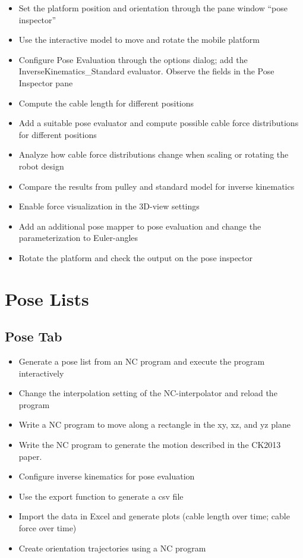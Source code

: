 \begin{itemize}
\item  {Set the platform position and orientation through the
  pane window ``pose inspector''}
\item
  {Use the interactive model to move and rotate the mobile
  platform}
\item  {Configure Pose Evaluation through the options dialog;
  add the InverseKinematics\_Standard evaluator. Observe the fields in
  the Pose Inspector
  pane}
\item  {Compute the cable length for different
  positions}
\item  {Add a suitable pose evaluator and compute possible
  cable force distributions for different
  positions}
\item  {Analyze how cable force distributions change when
  scaling or rotating the robot
  design}
\item  {Compare the results from pulley and standard model for
  inverse
  kinematics}
\end{itemize}

\begin{itemize}
\item  {Enable force visualization in the 3D-view
  settings}
\item  {Add an additional pose mapper to pose evaluation and
  change the parameterization to
  Euler-angles}
\item  {Rotate the platform and check the output on the pose
  inspector}
\end{itemize}

\section{Pose Lists}
\subsection{Pose Tab}

\begin{itemize}
\item  {Generate a pose list from an NC program and execute the
  program
  interactively}
\item  {Change the interpolation setting of the NC-interpolator
  and reload the
  program}
\item  {Write a NC program to move along a rectangle in the xy,
  xz, and yz
  plane}
\item  {Write the NC program to generate the motion described
  in the CK2013
  paper.}
\item  {Configure inverse kinematics for pose
  evaluation}
\item  {Use the export function to generate a csv
  file}
\item  {Import the data in Excel and generate plots (cable
  length over time; cable force over
  time)}
\item  {Create orientation trajectories using a NC
  program}
\end{itemize}


